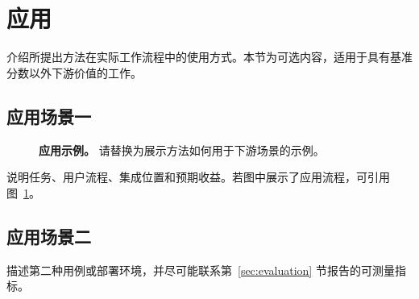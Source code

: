 \section{应用}

介绍所提出方法在实际工作流程中的使用方式。本节为可选内容，适用于具有基准分数以外下游价值的工作。

\subsection{应用场景一}

\begin{figure}[t]
  \centering
  \caption{\textbf{应用示例。} 请替换为展示方法如何用于下游场景的示例。}
  \label{fig:application_example}
\end{figure}

说明任务、用户流程、集成位置和预期收益。若图中展示了应用流程，可引用图~\ref{fig:application_example}。

\subsection{应用场景二}

描述第二种用例或部署环境，并尽可能联系第~\ref{sec:evaluation} 节报告的可测量指标。
